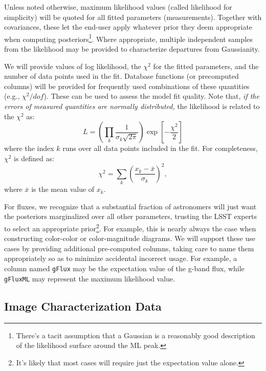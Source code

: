Unless noted otherwise, maximum likelihood values (called likelihood for simplicity) will be quoted for all fitted parameters (measurements). Together with covariances, these let the end-user apply whatever prior they deem appropriate when computing posteriors\footnote{There's a tacit assumption that a Gaussian is a reasonably good description of the likelihood surface around the ML peak.}. Where appropriate, multiple independent samples from the likelihood may be provided to characterize departures from Gaussianity.

We will provide values of log likelihood, the $\chi^2$ for the fitted parameters, and the number of data points used in the fit. Database functions (or precomputed columns) will be provided for frequently used combinations of these quantities (e.g., $\chi^2/dof$). These can be used to assess the model fit quality. Note that, \textit{if the errors of measured quantities are normally distributed,} the likelihood is related to the $\chi^2$ as:
%
\begin{equation}
    L = \left(\prod_{k}\frac{1}{\sigma_k \sqrt{2 \pi}}\right) \exp \left[- \frac{\chi^2}{2}\right]
\end{equation}
%
where the index $k$ runs over all data points included in the fit.
For completeness, $\chi^2$ is defined as:
%
\begin{equation}
      \chi^2 = \sum_{k} \left( \frac{x_k-\bar{x}}{\sigma_k}\right)^2,
\end{equation}
%
where $\bar{x}$ is the mean value of $x_k$.

For fluxes, we recognize that a substantial fraction of astronomers will just want the posteriors marginalized over all other parameters, trusting the LSST experts to select an appropriate prior\footnote{It's likely that most cases will require just the expectation value alone.}. For example, this is nearly always the case when constructing color-color or color-magnitude diagrams. We will support these use cases by providing additional pre-computed columns, taking care to name them appropriately so as to minimize accidental incorrect usage. For example, a column named \texttt{gFlux} may be the expectation value of the g-band flux, while \texttt{gFluxML} may represent the maximum likelihood value.

\subsection{Image Characterization Data}

